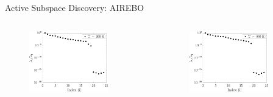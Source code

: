 \documentclass[handout,xcolor={x11names,table},compress,svgnames,mathserif]{beamer}
\renewcommand{\(}{\begin{columns}}
\renewcommand{\)}{\end{columns}}
\newcommand{\<}[1]{\begin{column}{#1}}
\renewcommand{\>}{\end{column}}
\begin{document}
\begin{frame}{Active Subspace Discovery: AIREBO}

\begin{columns}
\begin{column}{0.5\textwidth}
%
\begin{figure}[htbp]
\begin{center}
\includegraphics[width=0.8\textwidth]{./Figures/eig_airebo_k200}
\end{center}
\end{figure}
%
\end{column}
\hspace{-12mm}
\begin{column}{0.5\textwidth}
%
\begin{figure}[htbp]
\begin{center}
\includegraphics[width=0.8\textwidth]{./Figures/eig_airebo_k800}
\end{center}
\end{figure}
%

\end{column}
\end{columns}


\end{frame}
\end{document}
